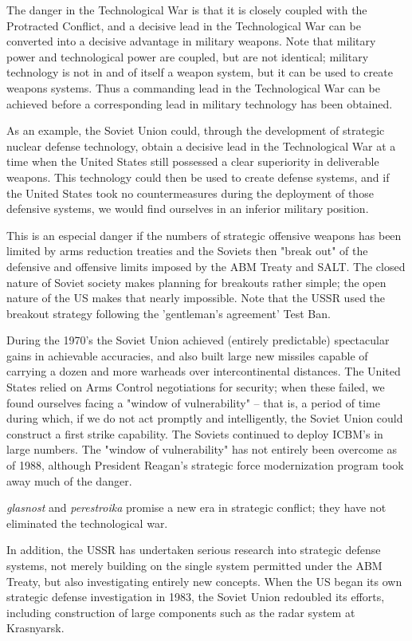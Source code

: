 The danger in the Technological War is that it is closely coupled with the Protracted Conflict, and a decisive lead in the Technological War can be converted into a decisive advantage in military weapons. Note that military power and technological power are coupled, but are not identical; military technology is not in and of itself a weapon system, but it can be used to create weapons systems. Thus a commanding lead in the Technological War can be achieved before a corresponding lead in military technology has been obtained.

As an example, the Soviet Union could, through the development of strategic nuclear defense technology, obtain a decisive lead in the Technological War at a time when the United States still possessed a clear superiority in deliverable weapons. This technology could then be used to create defense systems, and if the United States took no countermeasures during the deployment of those defensive systems, we would find ourselves in an inferior military position.

This is an especial danger if the numbers of strategic offensive weapons has been limited by arms reduction treaties and the Soviets then "break out" of the defensive and offensive limits imposed by the ABM Treaty and SALT. The closed nature of Soviet society makes planning for breakouts rather simple; the open nature of the US makes that nearly impossible. Note that the USSR used the breakout strategy following the 'gentleman's agreement' Test Ban.

During the 1970's the Soviet Union achieved (entirely predictable) spectacular gains in achievable accuracies, and also built large new missiles capable of carrying a dozen and more warheads over intercontinental distances. The United States relied on Arms Control negotiations for security; when these failed, we found ourselves facing a "window of vulnerability" -- that is, a period of time during which, if we do not act promptly and intelligently, the Soviet Union could construct a first strike capability. The Soviets continued to deploy ICBM's in large numbers. The "window of vulnerability" has not entirely been overcome as of 1988, although President Reagan's strategic force modernization program took away much of the danger.

\textit{glasnost} and \textit{perestroika} promise a new era in strategic conflict; they have not eliminated the technological war.

In addition, the USSR has undertaken serious research into strategic defense systems, not merely building on the single system permitted under the ABM Treaty, but also investigating entirely new concepts. When the US began its own strategic defense investigation in 1983, the Soviet Union redoubled its efforts, including construction of large components such as the radar system at Krasnyarsk.


